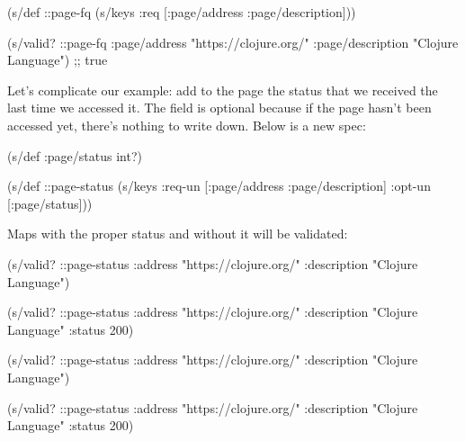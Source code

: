 \else

\begin{english}
  \begin{clojure}
(s/def ::page-fq
  (s/keys :req [:page/address
                :page/description]))

(s/valid? ::page-fq
          {:page/address "https://clojure.org/"
           :page/description "Clojure Language"})
;; true
  \end{clojure}
\end{english}

\fi

Let's complicate our example: add to the page the status that we received the last time we accessed it. The field is optional because if the page hasn't been accessed yet, there's nothing to write down. Below is a new spec:

\begin{english}
  \begin{clojure}
(s/def :page/status int?)

(s/def ::page-status
  (s/keys :req-un [:page/address
                   :page/description]
          :opt-un [:page/status]))
  \end{clojure}
\end{english}

Maps with the proper status and without it will be validated:

\ifx\DEVICETYPE\MOBILE

\begin{english}
  \begin{clojure}
(s/valid? ::page-status
  {:address "https://clojure.org/"
   :description "Clojure Language"})

(s/valid? ::page-status
  {:address "https://clojure.org/"
   :description "Clojure Language"
   :status 200})
  \end{clojure}
\end{english}

\else

\begin{english}
  \begin{clojure}
(s/valid? ::page-status
          {:address "https://clojure.org/"
           :description "Clojure Language"})

(s/valid? ::page-status
          {:address "https://clojure.org/"
           :description "Clojure Language"
           :status 200})
  \end{clojure}
\end{english}

